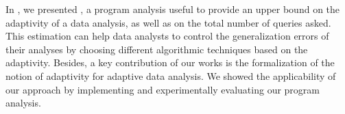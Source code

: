 In , we presented {\THESYSTEM}, a program analysis useful to provide an upper bound on the adaptivity of a data analysis, as well as on the total number of queries asked. This estimation can help data analysts to control the generalization errors of their analyses by choosing different algorithmic techniques based on the adaptivity. Besides, a key contribution of our works is the formalization of the notion of adaptivity for adaptive data analysis. We showed the applicability of our approach by implementing and experimentally evaluating our program analysis.
